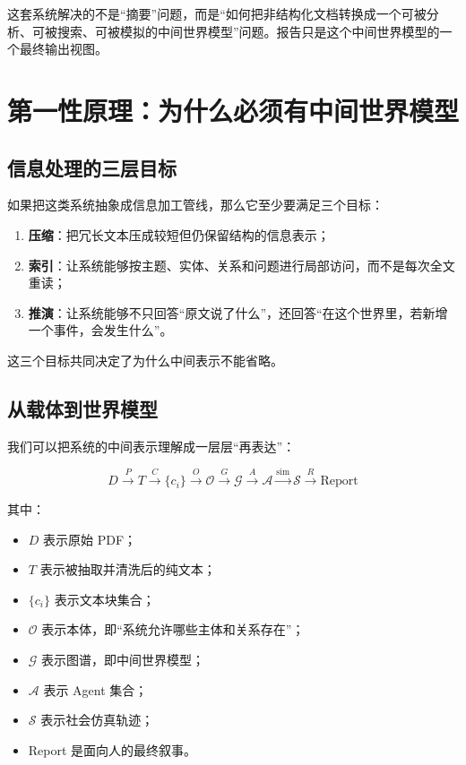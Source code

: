 \documentclass[UTF8,10pt,oneside]{ctexbook}
\begin{document}
\begin{takeawaybox}[本章核心结论]
这套系统解决的不是“摘要”问题，而是“如何把非结构化文档转换成一个可被分析、可被搜索、可被模拟的中间世界模型”问题。报告只是这个中间世界模型的一个最终输出视图。
\end{takeawaybox}

\chapter{第一性原理：为什么必须有中间世界模型}

\section{信息处理的三层目标}

如果把这类系统抽象成信息加工管线，那么它至少要满足三个目标：

\begin{enumerate}
  \item \textbf{压缩}：把冗长文本压成较短但仍保留结构的信息表示；
  \item \textbf{索引}：让系统能够按主题、实体、关系和问题进行局部访问，而不是每次全文重读；
  \item \textbf{推演}：让系统能够不只回答“原文说了什么”，还回答“在这个世界里，若新增一个事件，会发生什么”。
\end{enumerate}

这三个目标共同决定了为什么中间表示不能省略。

\section{从载体到世界模型}

我们可以把系统的中间表示理解成一层层“再表达”：

\[
D \xrightarrow{P} T \xrightarrow{C} \{c_i\} \xrightarrow{O} \mathcal{O}
\xrightarrow{G} \mathcal{G} \xrightarrow{A} \mathcal{A}
\xrightarrow{\text{sim}} \mathcal{S} \xrightarrow{R} \text{Report}
\]

其中：

\begin{itemize}
  \item \(D\) 表示原始 PDF；
  \item \(T\) 表示被抽取并清洗后的纯文本；
  \item \(\{c_i\}\) 表示文本块集合；
  \item \(\mathcal{O}\) 表示本体，即“系统允许哪些主体和关系存在”；
  \item \(\mathcal{G}\) 表示图谱，即中间世界模型；
  \item \(\mathcal{A}\) 表示 Agent 集合；
  \item \(\mathcal{S}\) 表示社会仿真轨迹；
  \item Report 是面向人的最终叙事。
\end{itemize}
\end{document}
